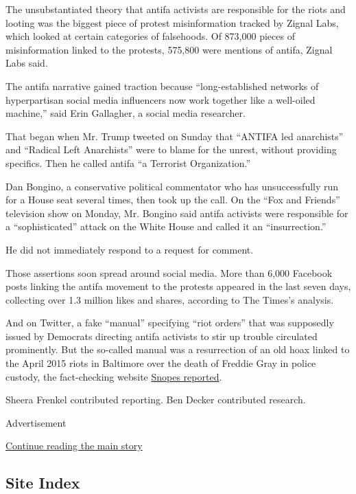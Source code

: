 The unsubstantiated theory that antifa activists are responsible for the
riots and looting was the biggest piece of protest misinformation
tracked by Zignal Labs, which looked at certain categories of
falsehoods. Of 873,000 pieces of misinformation linked to the protests,
575,800 were mentions of antifa, Zignal Labs said.

The antifa narrative gained traction because ``long-established networks
of hyperpartisan social media influencers now work together like a
well-oiled machine,'' said Erin Gallagher, a social media researcher.

That began when Mr. Trump tweeted on Sunday that ``ANTIFA led
anarchists'' and ``Radical Left Anarchists'' were to blame for the
unrest, without providing specifics. Then he called antifa ``a Terrorist
Organization.''

Dan Bongino, a conservative political commentator who has unsuccessfully
run for a House seat several times, then took up the call. On the ``Fox
and Friends'' television show on Monday, Mr. Bongino said antifa
activists were responsible for a ``sophisticated'' attack on the White
House and called it an ``insurrection.''

He did not immediately respond to a request for comment.

Those assertions soon spread around social media. More than 6,000
Facebook posts linking the antifa movement to the protests appeared in
the last seven days, collecting over 1.3 million likes and shares,
according to The Times's analysis.

And on Twitter, a fake ``manual'' specifying ``riot orders'' that was
supposedly issued by Democrats directing antifa activists to stir up
trouble circulated prominently. But the so-called manual was a
resurrection of an old hoax linked to the April 2015 riots in Baltimore
over the death of Freddie Gray in police custody, the fact-checking
website
\href{https://www.snopes.com/fact-check/floyd-instruction-manual-protesters/}{Snopes
reported}.

Sheera Frenkel contributed reporting. Ben Decker contributed research.

Advertisement

\protect\hyperlink{after-bottom}{Continue reading the main story}

\hypertarget{site-index}{%
\subsection{Site Index}\label{site-index}}

